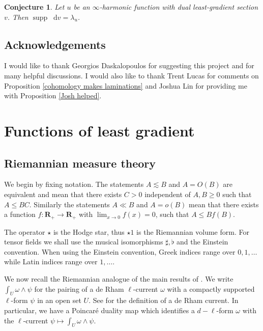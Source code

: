 \documentclass[reqno,12pt,letterpaper]{amsart}
\newcommand{\RR}{\mathbf{R}}
\DeclareMathOperator{\supp}{supp}
\newcommand*\dif{\mathop{}\!\mathrm{d}}
\newtheorem{conjecture}[theorem]{Conjecture}
\theoremstyle{definition}
\numberwithin{equation}{section}
\begin{document}
\begin{conjecture}\label{two laminations agree}
Let $u$ be an $\infty$-harmonic function with dual least-gradient section $v$.
Then $\supp \dif v = \lambda_u$.
\end{conjecture}



\subsection{Acknowledgements}
I would like to thank Georgios Daskalopoulos for suggesting this project and for many helpful discussions.
I would also like to thank Trent Lucas for comments on Proposition \ref{cohomology makes laminations} and Joshua Lin for providing me with Proposition \ref{Josh helped}.




\section{Functions of least gradient}\label{LeastGradientFunctions}
\subsection{Riemannian measure theory}
We begin by fixing notation.
The statements $A \lesssim B$ and $A = O(B)$ are equivalent and mean that there exists $C > 0$ independent of $A, B \geq 0$ such that $A \leq BC$.
Similarly the statements $A \ll B$ and $A = o(B)$ mean that there exists a function $f: \RR_+ \to \RR_+$ with $\lim_{x \to 0} f(x) = 0$, such that $A \leq Bf(B)$.

The operator $\star$ is the Hodge star, thus $\star 1$ is the Riemannian volume form.
For tensor fields we shall use the musical isomorphisms $\sharp, \flat$ and the Einstein convention.
When using the Einstein convention, Greek indices range over $0, 1, \dots$ while Latin indices range over $1, \dots$.

We now recall the Riemannian analogue of the main results of \cite[Chapter 1]{Giusti77}.
We write $\int_U \omega \wedge \psi$ for the pairing of a de Rham $\ell$-current $\omega$ with a compactly supported $\ell$-form $\psi$ in an open set $U$. See \cite{simon1983GMT} for the definition of a de Rham current.
In particular, we have a Poincar\'e duality map which identifies a $d - \ell$-form $\omega$ with the $\ell$-current $\psi \mapsto \int_U \omega \wedge \psi$.
\end{document}
